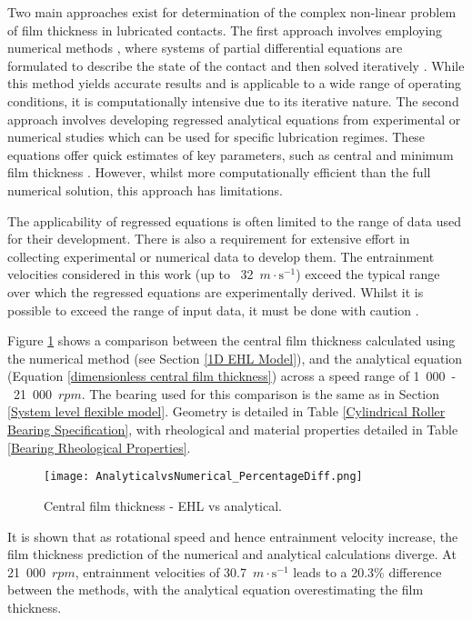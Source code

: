 Two main approaches exist for determination of the complex non-linear problem of film thickness in lubricated contacts. The first approach involves employing numerical methods \cite{Dowson1959}, where systems of partial differential equations are formulated to describe the state of the contact and then solved iteratively \cite{Gohar2018}. While this method yields accurate results and is applicable to a wide range of operating conditions, it is computationally intensive due to its iterative nature. The second approach involves developing regressed analytical equations from experimental or numerical studies which can be used for specific lubrication regimes. These equations offer quick estimates of key parameters, such as central \cite{Dowson1979} and minimum film thickness \cite{Dowson1967}. However, whilst more computationally efficient than the full numerical solution, this approach has limitations.
 
The applicability of regressed equations is often limited to the range of data used for their development. There is also a requirement for extensive effort in collecting experimental or numerical data to develop them. The entrainment velocities considered in this work (up to ~32~$m \cdot \mathrm{s}^{-1}$) exceed the typical range over which the regressed equations are experimentally derived. Whilst it is possible to exceed the range of input data, it must be done with caution \cite{Gohar1988}.

Figure \ref{EHL_NumericalvsAnalytical_25000} shows a comparison between the central film thickness calculated using the numerical method (see Section \ref{1D EHL Model}), and the analytical equation (Equation \ref{dimensionless central film thickness}) across a speed range of 1~000~-~21~000~$rpm$. The bearing used for this comparison is the same as in Section \ref{System level flexible model}. Geometry is detailed in Table \ref{Cylindrical Roller Bearing Specification}, with rheological and material properties detailed in Table \ref{Bearing Rheological Properties}.

\begin{figure}
	\centering
	\texttt{[image: AnalyticalvsNumerical\_PercentageDiff.png]}
	\caption{Central film thickness - EHL vs analytical.}
	\label{EHL_NumericalvsAnalytical_25000}
\end{figure} 

It is shown that as rotational speed and hence entrainment velocity increase, the film thickness prediction of the numerical and analytical calculations diverge. At 21~000~$rpm$, entrainment velocities of 30.7~$m \cdot \mathrm{s}^{-1}$ leads to a 20.3\% difference between the methods, with the analytical equation overestimating the film thickness.

